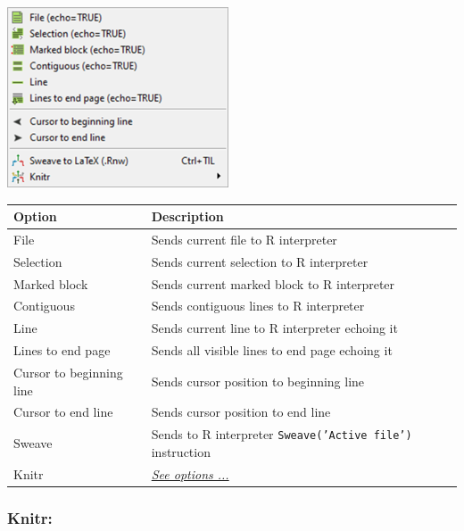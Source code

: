 \includegraphics[scale=0.50]{./res/menu_r_send.png}\\

\begin{scriptsize}
  \begin{tabularx}{\textwidth}{>{\hsize=0.5\hsize}X>{\hsize=0.7\hsize}X}\\
    \hline
    \textbf{Option} & \textbf{Description} \\
    \hline
    File & Sends current file to R interpreter \\
    Selection & Sends current selection to R interpreter \\
    Marked block & Sends current marked block to R interpreter \\
		  Contiguous & Sends contiguous lines to R interpreter \\
    Line & Sends current line to R interpreter echoing it \\
    Lines to end page & Sends all visible lines to end page echoing it \\
    \hdashline[1pt/1pt]
    Cursor to beginning line & Sends cursor position to beginning line \\
    Cursor to end line & Sends cursor position to end line \\
    \hdashline[1pt/1pt]
    Sweave & Sends to R interpreter \texttt{Sweave('Active file')} instruction \\
    Knitr & \textit{\href{\#menu\_r\_send\_knitr}{See options ...}} \\
    \hline
  \end{tabularx}
\end{scriptsize}

\hypertarget{menu_r_send_knitr}{}
\subsubsection{Knitr:}\\

